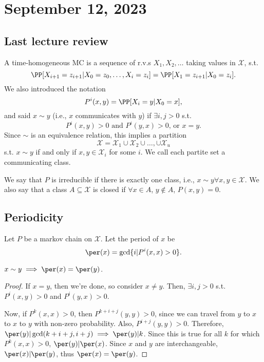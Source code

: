 \section{September 12, 2023}

\subsection{Last lecture review}

A time-homogeneous MC is a sequence of r.v.s $X_1, X_2, \hdots$ taking values in $\mathcal{X}$, s.t.
\[\PP[X_{i+1}=z_{i+1}|X_0=z_0, \hdots, X_i=z_i] = \PP[X_1=z_{i+1} | X_0 = z_i].\]
We also introduced the notation 
\[P^i(x,y) = \PP[X_i=y|X_0=x],\]
and said $x\sim y$ (i.e., $x$ \ac{communicates} with $y$) if $\exists i,j>0$ s.t. \[P^i(x,y)>0\text{ and }P^i(y,x)>0\text{, or } x=y.\]
Since $\sim$ is an equivalence relation, this implies a partition 
\[\mathcal{X} = \mathcal{X}_1\cup \mathcal{X}_2\cup \hdots, \cup \mathcal{X}_u\]
s.t. $x\sim y$ if and only if $x,y\in \mathcal{X}_i$ for some $i$. We call each partite set a \ac{communicating class}. 

We say that $P$ is \ac{irreducible} if there is exactly one class, i.e., $x\sim y\forall x,y\in \mathcal{X}$. We also say that a class $A\subseteq \mathcal{X}$ is \ac{closed} if $\forall x\in A$, $y\not\in A$, $P(x,y)=0$.  

\subsection{Periodicity}

\begin{definition}

Let $P$ be a markov chain on $\mathcal{X}$. Let the \ac{period} of $x$ be
\[\per(x) = \gcd\{i | P^i(x,x)>0\}.\]
\end{definition}

\begin{theorem}
\proplabel

$x\sim y\implies \per(x) = \per(y)$. 
\end{theorem}
\begin{proof}
If $x=y$, then we're done, so consider $x\neq y$. Then, $\exists i,j>0$ s.t. $P^i(x,y)>0$ and $P^i(y,x)>0$. 

Now, if $P^k(x,x)>0$, then $P^{k+i+j}(y,y)>0$, since we can travel from $y$ to $x$ to $x$ to $y$ with non-zero probability. Also, $P^{i+j}(y,y)>0$. Therefore, $\per(y)|\gcd(k+i+j,i+j)\implies \per(y)|k$. Since this is true for all $k$ for which $P^k(x,x)>0$, $\per(y)|\per(x)$. Since $x$ and $y$ are interchangeable, $\per(x)|\per(y)$, thus $\per(x) = \per(y)$. 
\end{proof}

